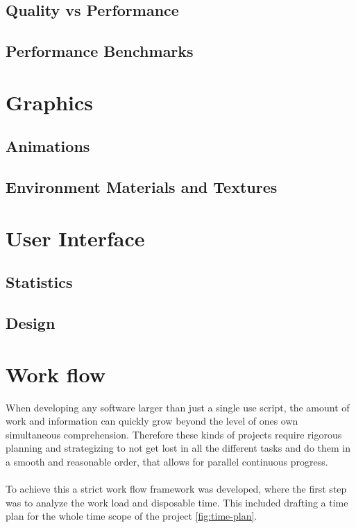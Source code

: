 \subsection{Quality vs Performance}

\subsection{Performance Benchmarks}


\section{Graphics}

\subsection{Animations}

\subsection{Environment Materials and Textures}


\section{User Interface}

\subsection{Statistics}

\subsection{Design}

\section{Work flow}
When developing any software larger than just a single use script, the amount of work and information can quickly grow beyond the level of ones own simultaneous comprehension. Therefore these kinds of projects require rigorous planning and strategizing to not get lost in all the different tasks and do them in a smooth and reasonable order, that allows for parallel continuous progress.
\\\\
To achieve this a strict work flow framework was developed, where the first step was to analyze the work load and disposable time. This included drafting a time plan for the whole time scope of the project \ref{fig:time-plan}. 

